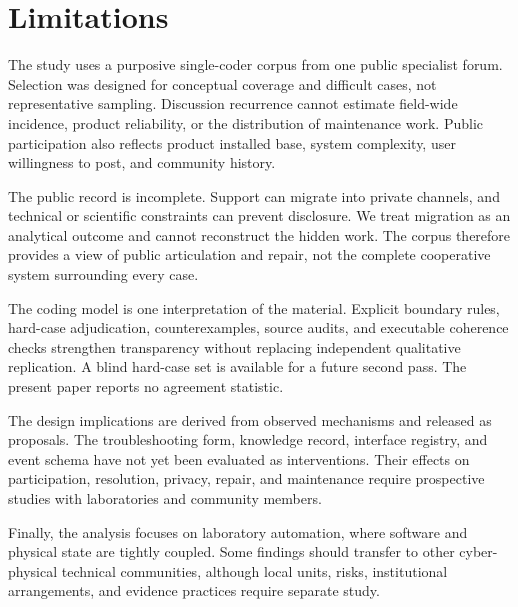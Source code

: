 \section{Limitations}

The study uses a purposive single-coder corpus from one public specialist forum. Selection was designed for conceptual coverage and difficult cases, not representative sampling. Discussion recurrence cannot estimate field-wide incidence, product reliability, or the distribution of maintenance work. Public participation also reflects product installed base, system complexity, user willingness to post, and community history.

The public record is incomplete. Support can migrate into private channels, and technical or scientific constraints can prevent disclosure. We treat migration as an analytical outcome and cannot reconstruct the hidden work. The corpus therefore provides a view of public articulation and repair, not the complete cooperative system surrounding every case.

The coding model is one interpretation of the material. Explicit boundary rules, hard-case adjudication, counterexamples, source audits, and executable coherence checks strengthen transparency without replacing independent qualitative replication. A blind hard-case set is available for a future second pass. The present paper reports no agreement statistic.

The design implications are derived from observed mechanisms and released as proposals. The troubleshooting form, knowledge record, interface registry, and event schema have not yet been evaluated as interventions. Their effects on participation, resolution, privacy, repair, and maintenance require prospective studies with laboratories and community members.

Finally, the analysis focuses on laboratory automation, where software and physical state are tightly coupled. Some findings should transfer to other cyber-physical technical communities, although local units, risks, institutional arrangements, and evidence practices require separate study.
